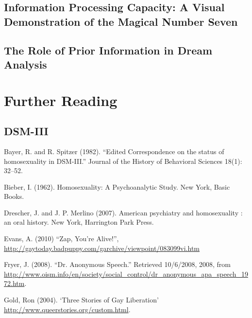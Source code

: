 \begin{refsection}
\begin{appendices}
\label{app: interobserverreliability}


\subsection{Information Processing Capacity: A Visual Demonstration of the Magical Number Seven}
\label{informationprocessingcapacity:avisualdemonstrationofthemagicalnumberseven}

\label{app: magicseven}


\subsection{The Role of Prior Information in Dream Analysis}
\label{theroleofpriorinformationindreamanalysis}

\label{app: dreamanalysis}


\pagebreak 

\section{Further Reading}
\label{furtherreading}

\subsection{DSM-III}
\label{dsm-iii}

Bayer, R. and R. Spitzer (1982). ``Edited Correspondence on the status of homosexuality in DSM-III.'' Journal of the History of Behavioral Sciences 18(1): 32--52.

Bieber, I. (1962). Homosexuality: A Psychoanalytic Study. New York, Basic Books.

Drescher, J. and J. P. Merlino (2007). American psychiatry and homosexuality : an oral history. New York, Harrington Park Press.

Evans, A. (2010) “Zap, You're Alive!”, \url{http://gaytoday.badpuppy.com/garchive/viewpoint/083099vi.htm}

Fryer, J. (2008). ``Dr. Anonymous Speech.'' Retrieved 10\slash 6\slash 2008, 2008, from \url{http://www.oism.info/en/society/social_control/dr_anonymous_apa_speech_1972.htm}.

Gold, Ron (2004). ‘Three Stories of Gay Liberation’ \url{http://www.queerstories.org/custom.html}.


\end{appendices}
\end{refsection}
